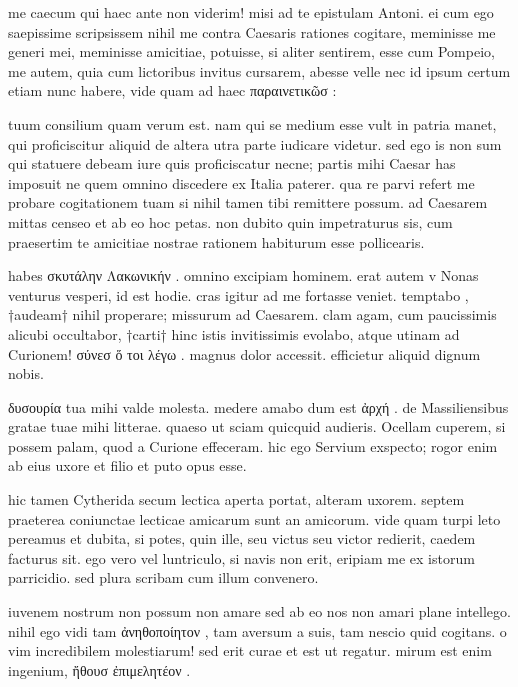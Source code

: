 


 me caecum qui haec ante non viderim! misi ad te epistulam Antoni. ei cum ego saepissime scripsissem nihil me contra Caesaris rationes cogitare, meminisse me generi mei, meminisse amicitiae, potuisse, si aliter sentirem, esse cum Pompeio, me autem, quia cum lictoribus invitus cursarem, abesse velle nec id ipsum certum etiam nunc habere, vide quam ad haec παραινετικῶσ :

 tuum consilium quam verum est. nam qui se medium esse vult in patria manet, qui proficiscitur aliquid de altera utra parte iudicare videtur. sed ego is non sum qui statuere debeam iure quis proficiscatur necne; partis mihi Caesar has imposuit ne quem omnino discedere ex Italia paterer. qua re parvi refert me probare cogitationem tuam si nihil tamen tibi remittere possum. ad Caesarem mittas censeo et ab eo hoc petas. non dubito quin impetraturus sis, cum praesertim te amicitiae nostrae rationem habiturum esse pollicearis.

 habes σκυτάλην Λακωνικήν . omnino excipiam hominem. erat autem v Nonas venturus vesperi, id est hodie. cras igitur ad me fortasse veniet. temptabo , †audeam† nihil properare; missurum ad Caesarem. clam agam, cum paucissimis alicubi occultabor, †carti† hinc istis invitissimis evolabo, atque utinam ad Curionem! σύνεσ ὅ τοι λέγω . magnus dolor accessit. efficietur aliquid dignum nobis.

 δυσουρία tua mihi valde molesta. medere amabo dum est ἀρχή . de Massiliensibus gratae tuae mihi litterae. quaeso ut sciam quicquid audieris. Ocellam cuperem, si possem palam, quod a Curione effeceram. hic ego Servium exspecto; rogor enim ab eius uxore et filio et puto opus esse.

 hic tamen Cytherida secum lectica aperta portat, alteram uxorem. septem praeterea coniunctae lecticae amicarum sunt an amicorum. vide quam turpi leto pereamus et dubita, si potes, quin ille, seu victus seu victor redierit, caedem facturus sit. ego vero vel luntriculo, si navis non erit, eripiam me ex istorum parricidio. sed plura scribam cum illum convenero.

 iuvenem nostrum non possum non amare sed ab eo nos non amari plane intellego. nihil ego vidi tam ἀνηθοποίητον , tam aversum a suis, tam nescio quid cogitans. o vim incredibilem molestiarum! sed erit curae et est ut regatur. mirum est enim ingenium, ἤθουσ ἐπιμελητέον .
